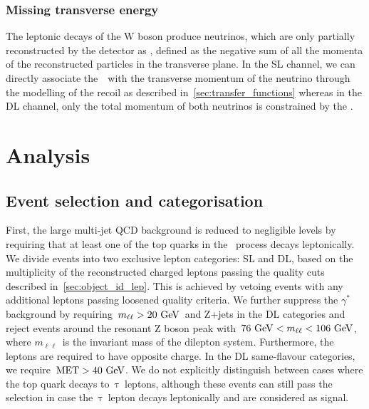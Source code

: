 \subsubsection{Missing transverse energy}
The leptonic decays of the W boson produce neutrinos, which are only partially reconstructed by the detector as \MET, defined as the negative sum of all the momenta of the reconstructed particles in the transverse plane. In the SL channel, we can directly associate the~\MET~with the transverse momentum of the neutrino through the modelling of the recoil as described in~\cref{sec:transfer_functions} whereas in the DL channel, only the total momentum of both neutrinos is constrained by the \MET.

\section{Analysis}
\label{sec:analysis}
\subsection{Event selection and categorisation}
\label{sec:event_selection}

First, the large multi-jet QCD background is reduced to negligible levels by requiring that at least one of the top quarks in the~\ttHbb\xspace process decays leptonically. We divide events into two exclusive lepton categories: SL and DL, based on the multiplicity of the reconstructed charged leptons passing the quality cuts described in~\cref{sec:object_id_lep}. This is achieved by vetoing events with any additional leptons passing loosened quality criteria. We further suppress the $\gamma^*$ background by requiring~$m_{\ell\ell} > 20~\mathrm{GeV}$~and Z+jets in the DL categories and reject events around the resonant Z boson peak with~$76~\mathrm{GeV} < m_{\ell\ell} < 106~\mathrm{GeV}$, where $m_{\ell\ell}$~is the invariant mass of the dilepton system. Furthermore, the leptons are required to have opposite charge. In the DL same-flavour categories, we require~$\mathrm{MET} > 40~\mathrm{GeV}$. We do not explicitly distinguish between cases where the top quark decays to~$\mathrm{\tau}$~leptons, although these events can still pass the selection in case the~$\mathrm{\tau}$~lepton decays leptonically and are considered as signal.


